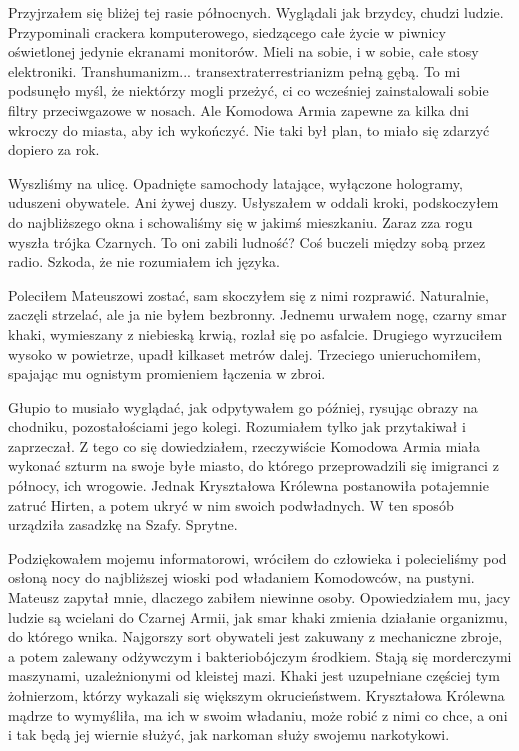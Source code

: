 Przyjrzałem się bliżej tej rasie północnych.
Wyglądali jak brzydcy, chudzi ludzie. Przypominali crackera komputerowego, siedzącego całe życie w piwnicy oświetlonej jedynie ekranami monitorów.
Mieli na sobie, i w sobie, całe stosy elektroniki.
Transhumanizm... transextraterrestrianizm pełną gębą.
To mi podsunęło myśl, że niektórzy mogli przeżyć, ci co wcześniej zainstalowali sobie filtry przeciwgazowe w nosach.
Ale Komodowa Armia zapewne za kilka dni wkroczy do miasta, aby ich wykończyć.
Nie taki był plan, to miało się zdarzyć dopiero za rok.

Wyszliśmy na ulicę. Opadnięte samochody latające, wyłączone hologramy, uduszeni obywatele.
Ani żywej duszy. Usłyszałem w oddali kroki, podskoczyłem do najbliższego okna i schowaliśmy się w jakimś mieszkaniu.
Zaraz zza rogu wyszła trójka Czarnych. To oni zabili ludność?
Coś buczeli między sobą przez radio.
Szkoda, że nie rozumiałem ich języka.

Poleciłem Mateuszowi zostać, sam skoczyłem się z nimi rozprawić.
Naturalnie, zaczęli strzelać, ale ja nie byłem bezbronny.
Jednemu urwałem nogę, czarny smar khaki, wymieszany z niebieską krwią, rozlał się po asfalcie.
Drugiego wyrzuciłem wysoko w powietrze, upadł kilkaset metrów dalej. 
Trzeciego unieruchomiłem, spajając mu ognistym promieniem łączenia w zbroi.

Głupio to musiało wyglądać, jak odpytywałem go później, rysując obrazy na chodniku, pozostałościami jego kolegi.
Rozumiałem tylko jak przytakiwał i zaprzeczał.
Z tego co się dowiedziałem, rzeczywiście Komodowa Armia miała wykonać szturm na swoje byłe miasto, do którego przeprowadzili się imigranci z północy, ich wrogowie.
Jednak Kryształowa Królewna postanowiła potajemnie zatruć Hirten, a potem ukryć w nim swoich podwładnych.
W ten sposób urządziła zasadzkę na Szafy. Sprytne.

Podziękowałem mojemu informatorowi, wróciłem do człowieka i polecieliśmy pod osłoną nocy do najbliższej wioski pod władaniem Komodowców, na pustyni.
Mateusz zapytał mnie, dlaczego zabiłem niewinne osoby.
Opowiedziałem mu, jacy ludzie są wcielani do Czarnej Armii, jak smar khaki zmienia działanie organizmu, do którego wnika.
Najgorszy sort obywateli jest zakuwany z mechaniczne zbroje, a potem zalewany odżywczym i bakteriobójczym środkiem.
Stają się morderczymi maszynami, uzależnionymi od kleistej mazi. Khaki jest uzupełniane częściej tym żołnierzom, którzy wykazali się większym okrucieństwem.
Kryształowa Królewna mądrze to wymyśliła, ma ich w swoim władaniu, może robić z nimi co chce, a oni i tak będą jej wiernie służyć, jak narkoman służy swojemu narkotykowi.

